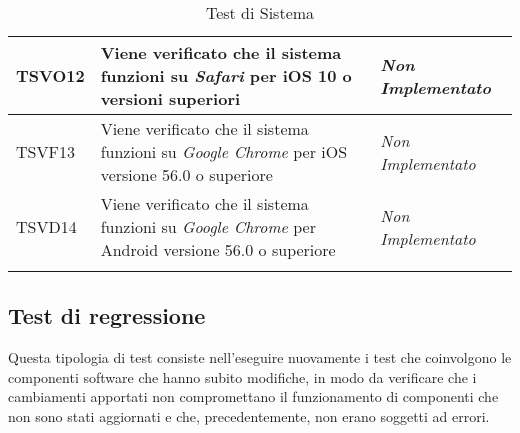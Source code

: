 \begin{longtable}{|>{\centering\arraybackslash}p{2.3cm}|>{\centering\arraybackslash}p{7.5cm} | >{\centering\arraybackslash}p{3.8cm}|}
		\hypertarget{TSVO12}{TSVO12} & Viene verificato che il sistema funzioni su \textit{Safari} per iOS 10 o versioni superiori & \textit{Non Implementato}\\ \hline
		\hypertarget{TSVF13}{TSVF13} & Viene verificato che il sistema funzioni su \textit{Google Chrome} per iOS versione 56.0 o superiore & \textit{Non Implementato}\\ \hline
		\hypertarget{TSVD14}{TSVD14} & Viene verificato che il sistema funzioni su \textit{Google Chrome} per Android versione 56.0 o superiore & \textit{Non Implementato}\\ \hline
		\caption[Test di Sistema]{Test di Sistema}
		\label{tabella:test1}
	\end{longtable}
	\clearpage
	
	\subsection{Test di regressione}
	Questa tipologia di test consiste nell'eseguire nuovamente i test che coinvolgono le componenti software che hanno subito modifiche, in modo da verificare che i cambiamenti apportati non compromettano il funzionamento di componenti che non sono stati aggiornati e che, precedentemente, non erano soggetti ad errori.
	
